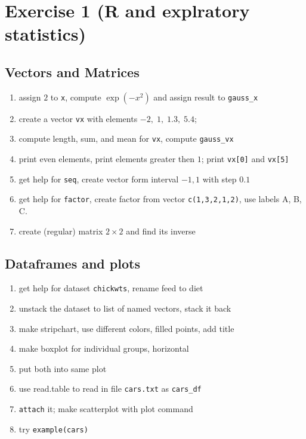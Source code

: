 \documentclass[4pt]{article}
\begin{document}
\section{Exercise 1 (R and explratory statistics)}
%
%
% 



\subsection{Vectors and Matrices}

\begin{enumerate}
 \item assign $2$ to \verb'x', compute $\exp(-x^2)$ and assign result to \verb'gauss_x'
 \item create a vector \verb'vx' with elements $-2,\;1,\;1.3,\;5.4$;
 \item compute length, sum, and mean for \verb'vx', compute \verb'gauss_vx'
 \item print even elements, print elements greater then $1$; print \verb'vx[0]' and \verb'vx[5]'
 \item get help for \verb'seq', create vector form interval $-1,1$ with step $0.1$
 \item get help for \verb'factor', create factor from vector \verb'c(1,3,2,1,2)', use labels A, B, C.
 \item create (regular) matrix $2\times 2$ and find its inverse
\end{enumerate}

\subsection{Dataframes and plots}
\begin{enumerate}
 \item get help for dataset \verb'chickwts', rename feed to diet
 \item unstack the dataset to list of named vectors, stack it back
 \item make stripchart, use different colors, filled points, add title
 \item make boxplot for individual groups, horizontal
 \item put both into same plot
 \item use read.table to read in file \verb'cars.txt' as \verb'cars_df'
 \item \verb'attach' it; make scatterplot with plot command
 \item try \verb'example(cars)'
\end{enumerate}
\end{document}
